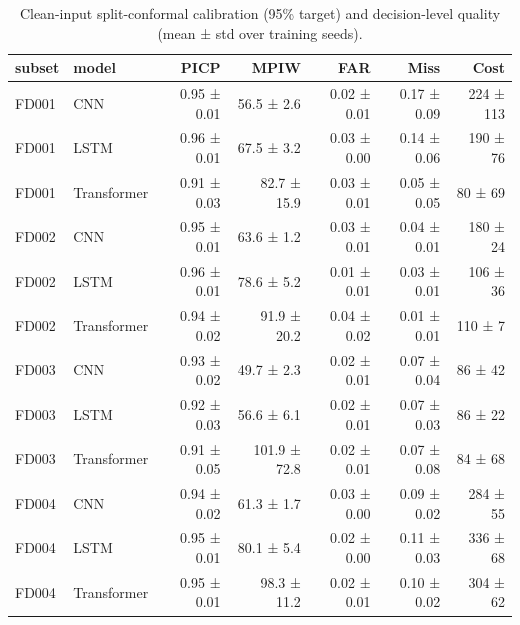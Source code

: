 \begin{table}
\caption{Clean-input split-conformal calibration (95\% target) and decision-level quality (mean ± std over training seeds).}
\label{tab:base_uq}
\begin{tabular}{llrrrrr}
\toprule  %
subset & model & PICP & MPIW & FAR & Miss & Cost \\
\midrule
FD001 & CNN & 0.95 ± 0.01 & 56.5 ± 2.6 & 0.02 ± 0.01 & 0.17 ± 0.09 & 224 ± 113 \\
FD001 & LSTM & 0.96 ± 0.01 & 67.5 ± 3.2 & 0.03 ± 0.00 & 0.14 ± 0.06 & 190 ± 76 \\
FD001 & Transformer & 0.91 ± 0.03 & 82.7 ± 15.9 & 0.03 ± 0.01 & 0.05 ± 0.05 & 80 ± 69 \\
FD002 & CNN & 0.95 ± 0.01 & 63.6 ± 1.2 & 0.03 ± 0.01 & 0.04 ± 0.01 & 180 ± 24 \\
FD002 & LSTM & 0.96 ± 0.01 & 78.6 ± 5.2 & 0.01 ± 0.01 & 0.03 ± 0.01 & 106 ± 36 \\
FD002 & Transformer & 0.94 ± 0.02 & 91.9 ± 20.2 & 0.04 ± 0.02 & 0.01 ± 0.01 & 110 ± 7 \\
FD003 & CNN & 0.93 ± 0.02 & 49.7 ± 2.3 & 0.02 ± 0.01 & 0.07 ± 0.04 & 86 ± 42 \\
FD003 & LSTM & 0.92 ± 0.03 & 56.6 ± 6.1 & 0.02 ± 0.01 & 0.07 ± 0.03 & 86 ± 22 \\
FD003 & Transformer & 0.91 ± 0.05 & 101.9 ± 72.8 & 0.02 ± 0.01 & 0.07 ± 0.08 & 84 ± 68 \\
FD004 & CNN & 0.94 ± 0.02 & 61.3 ± 1.7 & 0.03 ± 0.00 & 0.09 ± 0.02 & 284 ± 55 \\
FD004 & LSTM & 0.95 ± 0.01 & 80.1 ± 5.4 & 0.02 ± 0.00 & 0.11 ± 0.03 & 336 ± 68 \\
FD004 & Transformer & 0.95 ± 0.01 & 98.3 ± 11.2 & 0.02 ± 0.01 & 0.10 ± 0.02 & 304 ± 62 \\
\bottomrule
\end{tabular}
\end{table}
